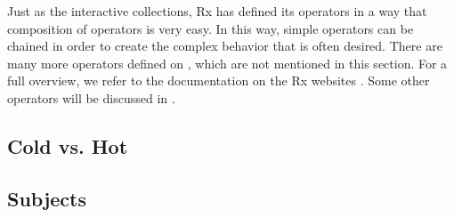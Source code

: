 Just as the interactive collections, Rx has defined its operators in a way that composition of operators is very easy. In this way, simple operators can be chained in order to create the complex behavior that is often desired. There are many more operators defined on \obs, which are not mentioned in this section. For a full overview, we refer to the documentation on the Rx websites . Some other operators will be discussed in . 

\subsection{Cold vs. Hot}

\subsection{Subjects}
